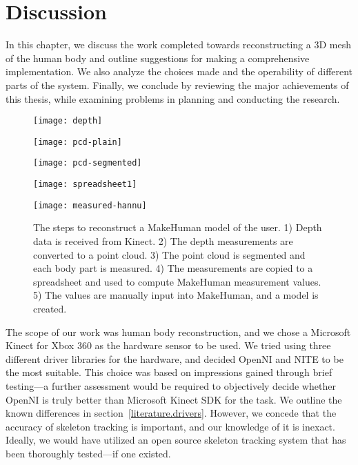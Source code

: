 \chapter{Discussion}

In this chapter, we discuss the work completed towards reconstructing a 3D mesh of the human body and outline suggestions for making a comprehensive implementation. We also analyze the choices made and the operability of different parts of the system. Finally, we conclude by reviewing the major achievements of this thesis, while examining problems in planning and conducting the research.

\begin{figure}
    \centering
    
    \begin{minipage}{0.39\textwidth}
        \texttt{[image: depth]}
    \end{minipage}
    \begin{minipage}{0.60\textwidth}
        \texttt{[image: pcd-plain]}
    \end{minipage}

    \texttt{[image: pcd-segmented]}
    
    \begin{minipage}{0.56\textwidth}
        \texttt{[image: spreadsheet1]}
    \end{minipage}
    \begin{minipage}{0.43\textwidth}
        \texttt{[image: measured-hannu]}
    \end{minipage}
    
    \caption{The steps to reconstruct a MakeHuman model of the user. 1) Depth data is received from Kinect. 2) The depth measurements are converted to a point cloud. 3) The point cloud is segmented and each body part is measured. 4) The measurements are copied to a spreadsheet and used to compute MakeHuman measurement values. 5) The values are manually input into MakeHuman, and a model is created.}
    \label{fig:steps}
\end{figure}


\newtopic

The scope of our work was human body reconstruction, and we chose a Microsoft Kinect for Xbox 360 as the hardware sensor to be used. We tried using three different driver libraries for the hardware, and decided OpenNI and NITE to be the most suitable. This choice was based on impressions gained through brief testing---a further assessment would be required to objectively decide whether OpenNI is truly better than Microsoft Kinect SDK for the task. We outline the known differences in section~\ref{literature.drivers}. However, we concede that the accuracy of skeleton tracking is important, and our knowledge of it is inexact. Ideally, we would have utilized an open source skeleton tracking system that has been thoroughly tested---if one existed.

